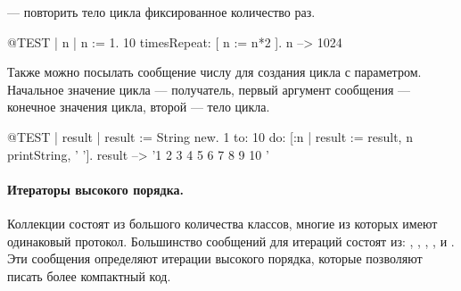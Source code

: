\documentclass[a4paper,10pt,twoside]{book}
\begin{document}
 --- повторить тело цикла фиксированное количество раз.

\begin{code}{@TEST | n |}
n := 1.
10 timesRepeat: [ n := n*2 ].
n --> 1024
\end{code}


Также можно посылать сообщение  числу для создания цикла с параметром.
Начальное значение цикла --- получатель, первый аргумент сообщения --- конечное значения цикла, второй --- тело цикла.

\begin{code}{@TEST | result |}
result := String new.
1 to: 10 do: [:n | result := result, n printString, ' '].
result --> '1 2 3 4 5 6 7 8 9 10 '
\end{code}



\paragraph{Итераторы высокого порядка.}
Коллекции состоят из большого количества классов, многие из которых имеют одинаковый протокол.
Большинство сообщений для итераций состоят из:
, , , ,  и .
Эти сообщения определяют итерации высокого порядка, которые позволяют писать более компактный код.
\end{document}
